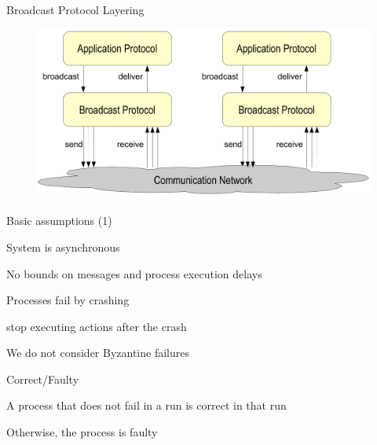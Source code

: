 \begin{frame}{Broadcast Protocol Layering}
	
\begin{figure}
\includegraphics[width=\textwidth]{figs/04/layers}
\end{figure}

\end{frame}


\begin{frame}{Basic assumptions (1)}
	
\BIL

\item \alert{System is asynchronous}
	\BI
	\item No bounds on messages and process execution delays
	\EI
	
\item \alert{Processes fail by crashing}
	\BI
	\item stop executing actions after the crash
	\item We do not consider Byzantine failures
	\EI
	
\item \alert{Correct/Faulty}
	\BI
	\item A process that does not fail in a run is \alert{correct} in that run
	\item Otherwise, the process is \alert{faulty}
	\EI
	
\EIL

\end{frame}

